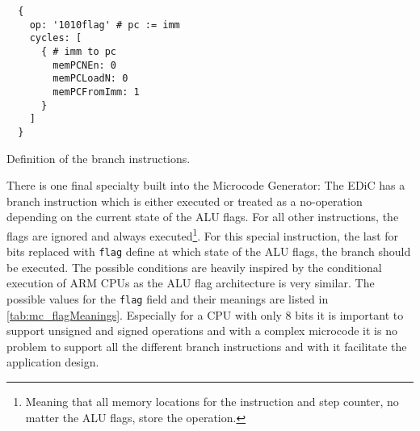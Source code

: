 \begin{listing}[h!]
  \begin{verbatim}
  {
    op: '1010flag' # pc := imm
    cycles: [
      { # imm to pc
        memPCNEn: 0
        memPCLoadN: 0
        memPCFromImm: 1
      }
    ]
  }
  \end{verbatim}
  \caption{Definition of the branch instructions.}
  \label{lst:mc_branch}
\end{listing}
There is one final specialty built into the Microcode Generator:
The \gls{EDiC} has a branch instruction which is either executed or treated as a no-operation depending on the current state of the \gls{ALU} flags.
For all other instructions, the flags are ignored and always executed\footnote{Meaning that all memory locations for the instruction and step counter, no matter the \gls{ALU} flags, store the operation.}.
For this special instruction, the last for bits replaced with \texttt{flag} define at which state of the \gls{ALU} flags, the branch should be executed.
The possible conditions are heavily inspired by the conditional execution of ARM \glspl{CPU}\cite{armCond} as the \gls{ALU} flag architecture is very similar.
The possible values for the \texttt{flag} field and their meanings are listed in \cref{tab:mc_flagMeanings}.
Especially for a \gls{CPU} with only 8 bits it is important to support unsigned and signed operations and with a complex microcode it is no problem to support all the different branch instructions and with it facilitate the application design.
